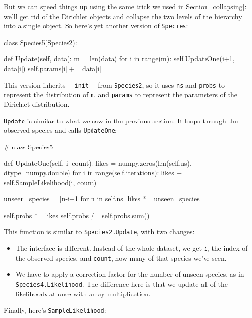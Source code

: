 \documentclass[12pt]{book}
\theoremstyle{exercise}
\begin{document}
But we can speed things up using the same trick we used in
Section~\ref{collapsing}: we'll get rid of the Dirichlet objects and
collapse the two levels of the hierarchy into a single object.  So
here's yet another version of {\tt Species}:

\begin{code}
class Species5(Species2):
    
    def Update(self, data):
        m = len(data)
        for i in range(m):
            self.UpdateOne(i+1, data[i])
            self.params[i] += data[i]
\end{code}

This version inherits \verb"__init__" from {\tt Species2}, so
it uses {\tt ns} and {\tt probs} to represent the distribution
of {\tt n}, and {\tt params} to represent the parameters of
the Dirichlet distribution.

{\tt Update} is similar to what we saw in the previous section.
It loops through the observed species and calls {\tt UpdateOne}:

\begin{code}
# class Species5

    def UpdateOne(self, i, count):
        likes = numpy.zeros(len(self.ns), dtype=numpy.double)
        for i in range(self.iterations):
            likes += self.SampleLikelihood(i, count)

        unseen_species = [n-i+1 for n in self.ns]
        likes *= unseen_species

        self.probs *= likes
        self.probs /= self.probs.sum()
\end{code}

This function is similar to {\tt Species2.Update}, with two changes:

\begin{itemize}

\item The interface is different.  Instead of the whole dataset, we
  get {\tt i}, the index of the observed species, and {\tt count},
  how many of that species we've seen.

\item We have to apply a correction factor for the number of unseen
  species, as in {\tt Species4.Likelihood}.  The difference here is
  that we update all of the likelihoods at once with array
  multiplication.

\end{itemize}

Finally, here's {\tt SampleLikelihood}:
\end{document}
